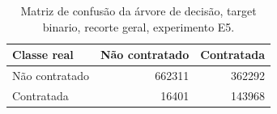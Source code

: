 \begin{table}
\caption{Matriz de confusão da árvore de decisão, target binario, recorte geral, experimento E5.}
\label{tab:matriz_confusao_treeClassification_10_profundidade_binario_recorte_geral_in_sample_e5}
\begin{tabular}{lrr}
\toprule
Classe real & Não contratado & Contratada \\
\midrule
Não contratado & 662311 & 362292 \\
Contratada & 16401 & 143968 \\
\bottomrule
\end{tabular}
\end{table}
